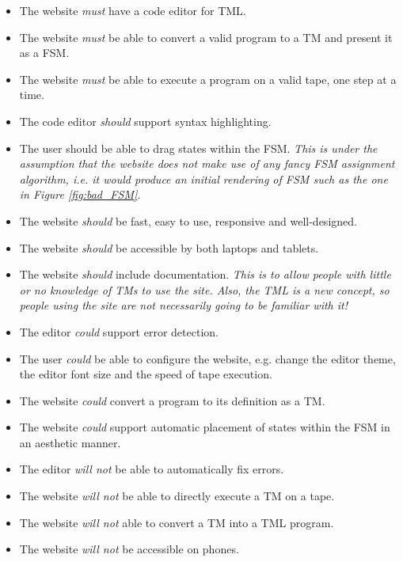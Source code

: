 \begin{itemize}
    \item The website \emph{must} have a code editor for TML.
    \item The website \emph{must} be able to convert a valid program to a TM and present it as a FSM.
    \item The website \emph{must} be able to execute a program on a valid tape, one step at a time.
    \item The code editor \emph{should} support syntax highlighting.
    \item The user should be able to drag states within the FSM. \textit{This is under the assumption that the website does not make use of any fancy FSM assignment algorithm, i.e. it would produce an initial rendering of FSM such as the one in Figure \ref{fig:bad_FSM}.}
    \item The website \emph{should} be fast, easy to use, responsive and well-designed.
    \item The website \emph{should} be accessible by both laptops and tablets.
    \item The website \emph{should} include documentation. \textit{This is to allow people with little or no knowledge of TMs to use the site. Also, the TML is a new concept, so people using the site are not necessarily going to be familiar with it!}
    \item The editor \emph{could} support error detection.
    \item The user \emph{could} be able to configure the website, e.g. change the editor theme, the editor font size and the speed of tape execution. 
    \item The website \emph{could} convert a program to its definition as a TM. 
    \item The website \emph{could} support automatic placement of states within the FSM in an aesthetic manner.
    \item The editor \emph{will not} be able to automatically fix errors.
    \item The website \emph{will not} be able to directly execute a TM on a tape. 
    \item The website \emph{will not} able to convert a TM into a TML program.
    \item The website \emph{will not} be accessible on phones.
\end{itemize}

